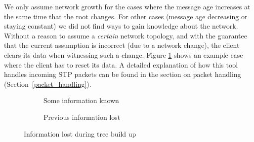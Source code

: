 We only assume network growth for the cases where the message age increases at the same time that the root changes.
For other cases (message age decreasing or staying constant) we did not find ways to gain knowledge about the network.
Without a reason to assume a \textit{certain} network topology, and with the guarantee that the current assumption is incorrect (due to a network change), the client clears its data when witnessing such a change.
Figure \ref{fig:information_lost} shows an example case where the client has to reset its data.
A detailed explanation of how this tool handles incoming STP packets can be found in the section on packet handling (Section~\ref{packet_handling}).

\begin{figure}[p]
    \begin{centering}
        \begin{subfigure}[b]{0.4\textwidth}
            \caption{Some information known}
        \end{subfigure}
        \hspace{1cm}
        \begin{subfigure}[b]{0.4\textwidth}
            \caption{Previous information lost}
        \end{subfigure}
        \caption{Information lost during tree build up}
        \label{fig:information_lost}
    \end{centering}
\end{figure}

